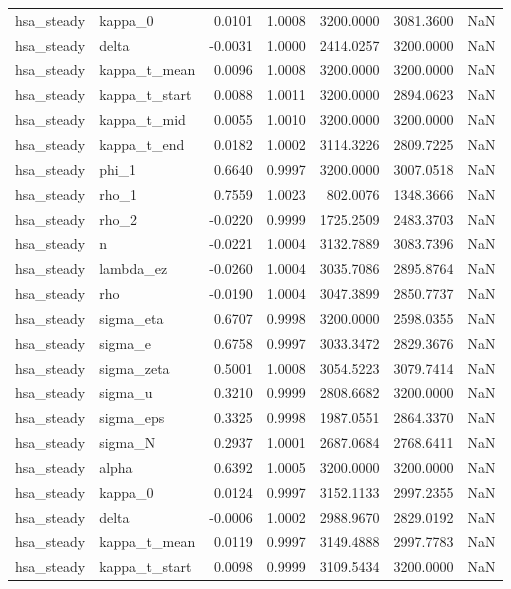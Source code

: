 \begin{tabular}{llrrrrl}
hsa\_steady & kappa\_0 & 0.0101 & 1.0008 & 3200.0000 & 3081.3600 & NaN \\
hsa\_steady & delta & -0.0031 & 1.0000 & 2414.0257 & 3200.0000 & NaN \\
hsa\_steady & kappa\_t\_mean & 0.0096 & 1.0008 & 3200.0000 & 3200.0000 & NaN \\
hsa\_steady & kappa\_t\_start & 0.0088 & 1.0011 & 3200.0000 & 2894.0623 & NaN \\
hsa\_steady & kappa\_t\_mid & 0.0055 & 1.0010 & 3200.0000 & 3200.0000 & NaN \\
hsa\_steady & kappa\_t\_end & 0.0182 & 1.0002 & 3114.3226 & 2809.7225 & NaN \\
hsa\_steady & phi\_1 & 0.6640 & 0.9997 & 3200.0000 & 3007.0518 & NaN \\
hsa\_steady & rho\_1 & 0.7559 & 1.0023 & 802.0076 & 1348.3666 & NaN \\
hsa\_steady & rho\_2 & -0.0220 & 0.9999 & 1725.2509 & 2483.3703 & NaN \\
hsa\_steady & n & -0.0221 & 1.0004 & 3132.7889 & 3083.7396 & NaN \\
hsa\_steady & lambda\_ez & -0.0260 & 1.0004 & 3035.7086 & 2895.8764 & NaN \\
hsa\_steady & rho & -0.0190 & 1.0004 & 3047.3899 & 2850.7737 & NaN \\
hsa\_steady & sigma\_eta & 0.6707 & 0.9998 & 3200.0000 & 2598.0355 & NaN \\
hsa\_steady & sigma\_e & 0.6758 & 0.9997 & 3033.3472 & 2829.3676 & NaN \\
hsa\_steady & sigma\_zeta & 0.5001 & 1.0008 & 3054.5223 & 3079.7414 & NaN \\
hsa\_steady & sigma\_u & 0.3210 & 0.9999 & 2808.6682 & 3200.0000 & NaN \\
hsa\_steady & sigma\_eps & 0.3325 & 0.9998 & 1987.0551 & 2864.3370 & NaN \\
hsa\_steady & sigma\_N & 0.2937 & 1.0001 & 2687.0684 & 2768.6411 & NaN \\
hsa\_steady & alpha & 0.6392 & 1.0005 & 3200.0000 & 3200.0000 & NaN \\
hsa\_steady & kappa\_0 & 0.0124 & 0.9997 & 3152.1133 & 2997.2355 & NaN \\
hsa\_steady & delta & -0.0006 & 1.0002 & 2988.9670 & 2829.0192 & NaN \\
hsa\_steady & kappa\_t\_mean & 0.0119 & 0.9997 & 3149.4888 & 2997.7783 & NaN \\
hsa\_steady & kappa\_t\_start & 0.0098 & 0.9999 & 3109.5434 & 3200.0000 & NaN \\

\end{tabular}
